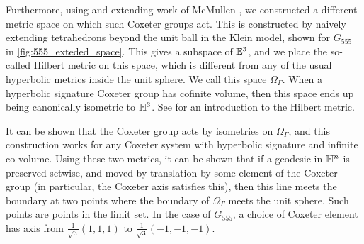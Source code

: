 Furthermore, using and extending work of McMullen \cite{mcmullen_coxeter_2002}, we constructed a different metric space on which such Coxeter groups act.
This is constructed by naively extending tetrahedrons beyond the unit ball in the Klein model, shown for $G_{555}$ in \cref{fig:555_exteded_space}.
This gives a subspace of $\mathbb{E}^3$, and we place the so-called Hilbert metric on this space, which is different from any of the usual hyperbolic metrics inside the unit sphere.
We call this space $\Omega_\Gamma$.
When a hyperbolic signature Coxeter group has cofinite volume, then this space ends up being canonically isometric to  $\mathbb{H}^3$.
See \cite{papadopoulos_troyanov_handbook_2014} for an introduction to the Hilbert metric.

It can be shown that the Coxeter group acts by isometries on $\Omega_\Gamma$, and this construction works for any Coxeter system with hyperbolic signature and infinite co-volume.
Using these two metrics, it can be shown that if a geodesic in $\mathbb{H}^n$ is preserved setwise, and moved by translation by some element of the Coxeter group (in particular, the Coxeter axis satisfies this), then this line meets the boundary at two points where the boundary of $\Omega_\Gamma$ meets the unit sphere.
Such points are points in the limit set.
In the case of $G_{555}$, a choice of Coxeter element has axis from  $\frac{1}{\sqrt{3}}(1,1,1)$ to $\frac{1}{\sqrt{3}}(-1,-1,-1)$.


